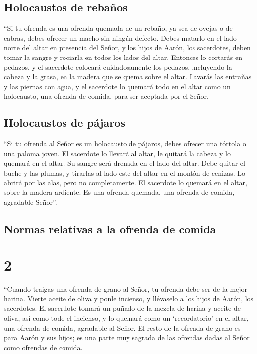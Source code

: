 \hypertarget{holocaustos-de-rebauxf1os}{%
\subsection{Holocaustos de rebaños}\label{holocaustos-de-rebauxf1os}}

 ``Si tu ofrenda es una ofrenda quemada de un rebaño, ya
sea de ovejas o de cabras, debes ofrecer un macho sin ningún defecto.
 Debes matarlo en el lado norte del altar en presencia
del Señor, y los hijos de Aarón, los sacerdotes, deben tomar la sangre y
rociarla en todos los lados del altar.  Entonces lo
cortarás en pedazos, y el sacerdote colocará cuidadosamente los pedazos,
incluyendo la cabeza y la grasa, en la madera que se quema sobre el
altar.  Lavarás las entrañas y las piernas con agua, y el
sacerdote lo quemará todo en el altar como un holocausto, una ofrenda de
comida, para ser aceptada por el Señor.

\hypertarget{holocaustos-de-puxe1jaros}{%
\subsection{Holocaustos de pájaros}\label{holocaustos-de-puxe1jaros}}

 ``Si tu ofrenda al Señor es un holocausto de pájaros,
debes ofrecer una tórtola o una paloma joven.  El
sacerdote lo llevará al altar, le quitará la cabeza y lo quemará en el
altar. Su sangre será drenada en el lado del altar.  Debe
quitar el buche y las plumas, y tirarlas al lado este del altar en el
montón de cenizas.  Lo abrirá por las alas, pero no
completamente. El sacerdote lo quemará en el altar, sobre la madera
ardiente. Es una ofrenda quemada, una ofrenda de comida, agradable
Señor''.

\hypertarget{normas-relativas-a-la-ofrenda-de-comida}{%
\subsection{Normas relativas a la ofrenda de
comida}\label{normas-relativas-a-la-ofrenda-de-comida}}

\hypertarget{section-1}{%
\section{2}\label{section-1}}

 ``Cuando traigas una ofrenda de grano al Señor, tu
ofrenda debe ser de la mejor harina. Vierte aceite de oliva y ponle
incienso,  y llévaselo a los hijos de Aarón, los
sacerdotes. El sacerdote tomará un puñado de la mezcla de harina y
aceite de oliva, así como todo el incienso, y lo quemará como un
`recordatorio' en el altar, una ofrenda de comida, agradable al Señor.
 El resto de la ofrenda de grano es para Aarón y sus
hijos; es una parte muy sagrada de las ofrendas dadas al Señor como
ofrendas de comida.

